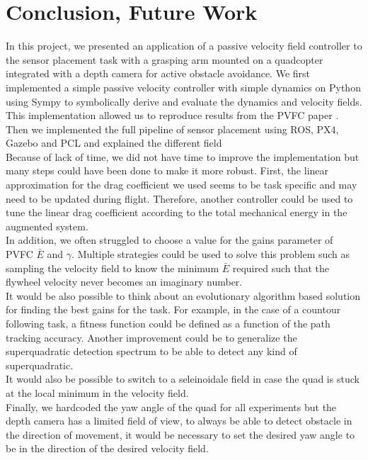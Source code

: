 \section{Conclusion, Future Work}
In this project, we presented an application of a passive velocity field controller to the sensor placement task with a grasping arm mounted on a quadcopter integrated with a depth camera for active obstacle avoidance. 
We first implemented a simple passive velocity controller with simple dynamics on Python using Sympy to symbolically derive and evaluate the dynamics and velocity fields. 
This implementation allowed us to reproduce results from the PVFC paper \cite{li1999passive}.
Then we implemented the full pipeline of sensor placement using ROS, PX4, Gazebo and PCL and explained the different field\\

Because of lack of time, we did not have time to improve the implementation but many steps could have been done to make it more robust.
First, the linear approximation for the drag coefficient we used seems to be task specific and may need to be updated during flight. Therefore, another controller could be used to tune the linear drag coefficient 
according to the total mechanical energy in the augmented system.\\
In addition, we often struggled to choose a value for the gains parameter of PVFC $\bar{E}$ and $\gamma$. Multiple strategies could be used to solve this problem such as sampling the velocity field to know the minimum $\bar{E}$ required 
such that the flywheel velocity never becomes an imaginary number. \\
It would be also possible to think about an evolutionary algorithm based solution for finding the best gains for the task. For example, in the case of a countour following task, a fitness function could be defined as a function of the path tracking accuracy.
Another improvement could be to generalize the superquadratic detection spectrum to be able to detect any kind of superquadratic.\\
It would also be possible to switch to a seleinoidale field in case the quad is stuck at the local minimum in the velocity field.\\
Finally, we hardcoded the yaw angle of the quad for all experiments but the depth camera has a limited field of view, to always be able to detect obstacle in the direction of movement, it would be necessary to set the desired yaw angle to be in the direction of the desired velocity field.

